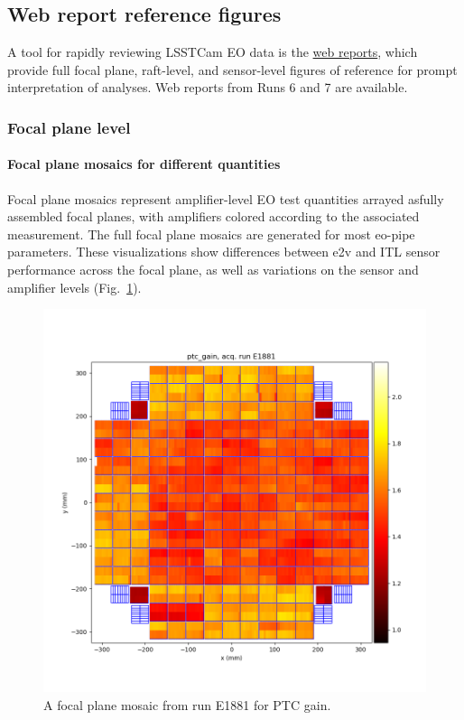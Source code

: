 \subsection{Web report reference figures}

A tool for rapidly reviewing LSSTCam EO data is the \href{https://s3df.slac.stanford.edu/data/rubin/lsstcam/}{web reports}, which provide full focal plane, raft-level, and sensor-level figures of reference for prompt interpretation of analyses. Web reports from Runs 6 and 7 are available.

\subsubsection{Focal plane level}

\paragraph{Focal plane mosaics for different quantities}

Focal plane mosaics represent amplifier-level EO test quantities arrayed asfully assembled focal planes, with amplifiers colored according to the associated measurement. The full focal plane mosaics are generated for most eo-pipe parameters.
These visualizations show differences between e2v and ITL sensor performance across the focal plane, as well as variations on the sensor and amplifier levels (Fig.~\ref{fig:ref:fpMosaic}).

\begin{figure}[ht]
    \centering
    \includegraphics[width=0.7\linewidth]{figures/ReferenceFigures/ptc_gain_plot_LSSTCam_u_lsstccs_eo_ptc_plots_E1881_w_2024_35_20241105T131208Z.png}
    \caption{A focal plane mosaic from run E1881 for PTC gain.}
    \label{fig:ref:fpMosaic}
\end{figure}
\clearpage
